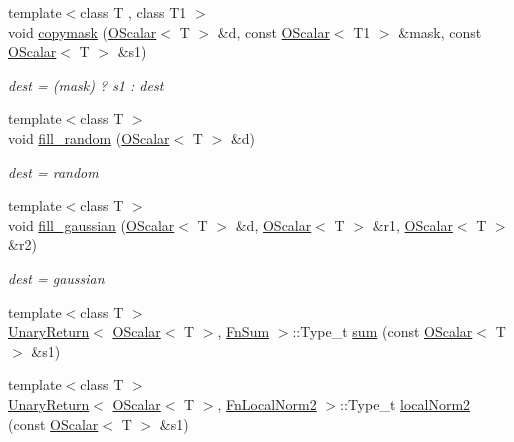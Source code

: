 \begin{DoxyCompactItemize}
{\footnotesize template$<$class T , class T1 $>$ }\\void \mbox{\hyperlink{group__obsscalar_gada3c474cf374d31a9df7c6cba2d608eb}{copymask}} (\mbox{\hyperlink{classENSEM_1_1OScalar}{O\+Scalar}}$<$ T $>$ \&d, const \mbox{\hyperlink{classENSEM_1_1OScalar}{O\+Scalar}}$<$ T1 $>$ \&mask, const \mbox{\hyperlink{classENSEM_1_1OScalar}{O\+Scalar}}$<$ T $>$ \&s1)
\begin{DoxyCompactList}\small\item\em dest = (mask) ? s1 \+: dest \end{DoxyCompactList}\item 
{\footnotesize template$<$class T $>$ }\\void \mbox{\hyperlink{group__obsscalar_ga8550bbdcfe7af4b27a905b3f89cca5b3}{fill\+\_\+random}} (\mbox{\hyperlink{classENSEM_1_1OScalar}{O\+Scalar}}$<$ T $>$ \&d)
\begin{DoxyCompactList}\small\item\em dest = random \end{DoxyCompactList}\item 
{\footnotesize template$<$class T $>$ }\\void \mbox{\hyperlink{group__obsscalar_gaf665bb772c121b0cab02a5f3244b4c3d}{fill\+\_\+gaussian}} (\mbox{\hyperlink{classENSEM_1_1OScalar}{O\+Scalar}}$<$ T $>$ \&d, \mbox{\hyperlink{classENSEM_1_1OScalar}{O\+Scalar}}$<$ T $>$ \&r1, \mbox{\hyperlink{classENSEM_1_1OScalar}{O\+Scalar}}$<$ T $>$ \&r2)
\begin{DoxyCompactList}\small\item\em dest = gaussian \end{DoxyCompactList}\item 
{\footnotesize template$<$class T $>$ }\\\mbox{\hyperlink{structENSEM_1_1UnaryReturn}{Unary\+Return}}$<$ \mbox{\hyperlink{classENSEM_1_1OScalar}{O\+Scalar}}$<$ T $>$, \mbox{\hyperlink{structENSEM_1_1FnSum}{Fn\+Sum}} $>$\+::Type\+\_\+t \mbox{\hyperlink{group__obsscalar_ga969a0fc381c5a006e976f67c513c4828}{sum}} (const \mbox{\hyperlink{classENSEM_1_1OScalar}{O\+Scalar}}$<$ T $>$ \&s1)
\item 
{\footnotesize template$<$class T $>$ }\\\mbox{\hyperlink{structENSEM_1_1UnaryReturn}{Unary\+Return}}$<$ \mbox{\hyperlink{classENSEM_1_1OScalar}{O\+Scalar}}$<$ T $>$, \mbox{\hyperlink{structENSEM_1_1FnLocalNorm2}{Fn\+Local\+Norm2}} $>$\+::Type\+\_\+t \mbox{\hyperlink{group__obsscalar_ga2bc0a069388839d76a68f281dce936a6}{local\+Norm2}} (const \mbox{\hyperlink{classENSEM_1_1OScalar}{O\+Scalar}}$<$ T $>$ \&s1)

\end{DoxyCompactItemize}
